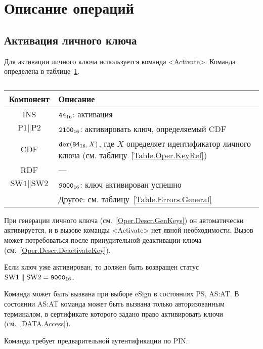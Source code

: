 \section{Описание операций}\label{Oper.Descr}

\subsection{Активация личного ключа}\label{Oper.Descr.ActivateKey}

Для активации личного ключа используется команда <Activate>.
Команда определена в таблице~\ref{Table.Oper.ActivateCmd}.

\begin{table}[hbt]
\caption{}\label{Table.Oper.ActivateCmd}
\begin{tabular}{|c|p{14cm}|}
\hline
Компонент & Описание\\
\hline
\hline
INS & $\texttt{44}_{16}$: активация\\
\hline
$\text{P1} \parallel \text{P2}$ & $\texttt{2100}_{16}$: 
активировать ключ, определяемый CDF\\
\hline
CDF &  $\texttt{der}(\texttt{84}_{16}, X)$,   
где $X$ определяет идентификатор личного ключа 
(см. таблицу~\ref{Table.Oper.KeyRef}) \\ 
\hline
\hline
RDF &  --- \\
\hline
$\text{SW1} \parallel \text{SW2}$ & $\texttt{9000}_{16}$: ключ активирован успешно \\
\cline{2-2}
  & Другое: см. таблицу~\ref{Table.Errors.General} \\
\hline
\end{tabular}
\end{table}

При генерации личного ключа (см.~\ref{Oper.Descr.GenKeys})
он автоматически активируется, и в вызове команды <Activate> нет явной 
необходимости. Вызов может потребоваться после принудительной деактивации ключа 
(см.~\ref{Oper.Descr.DeactivateKey}).

Если ключ уже активирован, то должен быть 
возвращен статус $\text{SW1} \parallel \text{SW2} = \texttt{9000}_{16}$.

Команда может быть вызвана при выборе eSign в состояниях PS, AS:AT. В состоянии 
AS:AT команда может быть вызвана только авторизованным терминалом, в 
сертификате которого задано право активировать ключи (см.~\ref{DATA.Access}). 

Команда требует предварительной аутентификации по PIN.

